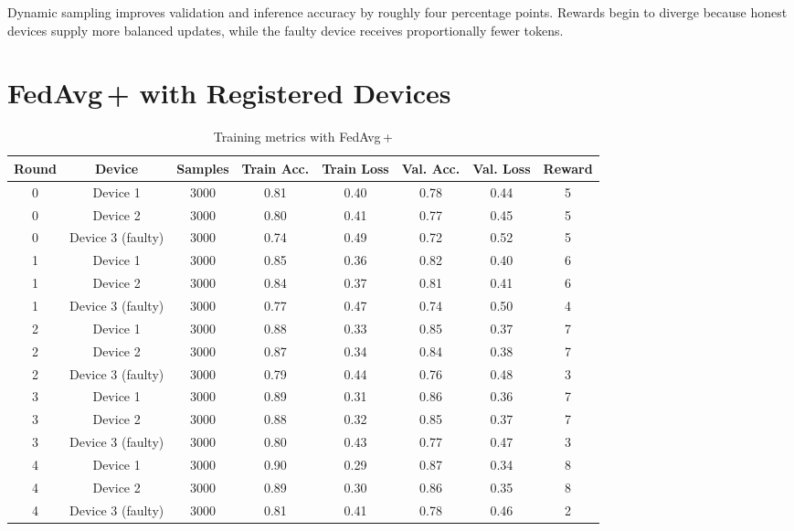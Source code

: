Dynamic sampling improves validation and inference accuracy by roughly four percentage points. Rewards begin to diverge because honest devices supply more balanced updates, while the faulty device receives proportionally fewer tokens.

\section{FedAvg\,+ with Registered Devices}

\begin{table}[h!]
    \centering
    \caption{Training metrics with FedAvg\,+}
    \label{tab:fedavg_plus}
    \begin{tabular}{c c c c c c c c}
        \toprule
        \textbf{Round} & \textbf{Device} & \textbf{Samples} & \textbf{Train Acc.} & \textbf{Train Loss} & \textbf{Val. Acc.} & \textbf{Val. Loss} & \textbf{Reward} \\
        \midrule
        0 & Device 1 & 3000 & 0.81 & 0.40 & 0.78 & 0.44 & 5 \\
        0 & Device 2 & 3000 & 0.80 & 0.41 & 0.77 & 0.45 & 5 \\
        0 & Device 3 (faulty) & 3000 & 0.74 & 0.49 & 0.72 & 0.52 & 5 \\
        1 & Device 1 & 3000 & 0.85 & 0.36 & 0.82 & 0.40 & 6 \\
        1 & Device 2 & 3000 & 0.84 & 0.37 & 0.81 & 0.41 & 6 \\
        1 & Device 3 (faulty) & 3000 & 0.77 & 0.47 & 0.74 & 0.50 & 4 \\
        2 & Device 1 & 3000 & 0.88 & 0.33 & 0.85 & 0.37 & 7 \\
        2 & Device 2 & 3000 & 0.87 & 0.34 & 0.84 & 0.38 & 7 \\
        2 & Device 3 (faulty) & 3000 & 0.79 & 0.44 & 0.76 & 0.48 & 3 \\
        3 & Device 1 & 3000 & 0.89 & 0.31 & 0.86 & 0.36 & 7 \\
        3 & Device 2 & 3000 & 0.88 & 0.32 & 0.85 & 0.37 & 7 \\
        3 & Device 3 (faulty) & 3000 & 0.80 & 0.43 & 0.77 & 0.47 & 3 \\
        4 & Device 1 & 3000 & 0.90 & 0.29 & 0.87 & 0.34 & 8 \\
        4 & Device 2 & 3000 & 0.89 & 0.30 & 0.86 & 0.35 & 8 \\
        4 & Device 3 (faulty) & 3000 & 0.81 & 0.41 & 0.78 & 0.46 & 2 \\
        \bottomrule
    \end{tabular}
\end{table}

